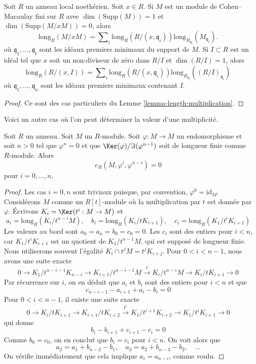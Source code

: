 \begin{lemma}
\label{lemma-additivity-divisors-restricted}
Soit $R$ un anneau local noethérien.
Soit $x \in R$. Si $M$ est un module de Cohen--Macaulay fini sur $R$
avec $\dim(\text{Supp}(M)) = 1$ et $\dim(\text{Supp}(M/xM)) = 0$, alors
$$
\text{long}_R(M/xM)
=
\sum\nolimits_i \text{long}_R(R/(x, \mathfrak q_i))
\text{long}_{R_{\mathfrak q_i}}(M_{\mathfrak q_i}).
$$
où $\mathfrak q_1, \ldots, \mathfrak q_t$ sont les idéaux premiers
minimaux du support de $M$. Si $I \subset R$ est un idéal
tel que $x$ soit un non-diviseur de zéro dans $R/I$ et $\dim(R/I) = 1$, alors
$$
\text{long}_R(R/(x, I))
=
\sum\nolimits_i \text{long}_R(R/(x, \mathfrak q_i))
\text{long}_{R_{\mathfrak q_i}}((R/I)_{\mathfrak q_i})
$$
où $\mathfrak q_1, \ldots, \mathfrak q_n$ sont les idéaux premiers minimaux
contenant $I$.
\end{lemma}

\begin{proof}
Ce sont des cas particuliers du Lemme \ref{lemma-length-multiplication}.
\end{proof}

\noindent
Voici un autre cas où l'on peut déterminer la valeur d'une multiplicité.

\begin{lemma}
\label{lemma-powers-period-length-zero}
Soit $R$ un anneau. Soit $M$ un $R$-module.
Soit $\varphi : M \to M$ un endomorphisme et soit $n > 0$
tel que $\varphi^n = 0$ et que $\Ker(\varphi)/\Im(\varphi^{n - 1})$
soit de longueur finie comme $R$-module.
Alors
$$
e_R(M, \varphi^i, \varphi^{n - i}) = 0
$$
pour $i = 0, \ldots, n$.
\end{lemma}

\begin{proof}
Les cas $i = 0, n$ sont triviaux puisque, par convention, $\varphi^0 = \text{id}_M$.
Considérons $M$ comme un $R[t]$-module où la multiplication par $t$
est donnée par $\varphi$. Écrivons
$K_i = \Ker(t^i : M \to M)$ et
$$
a_i = \text{long}_R(K_i/t^{n - i}M),\quad
b_i = \text{long}_R(K_i/tK_{i + 1}),\quad
c_i = \text{long}_R(K_1/t^iK_{i + 1})
$$
Les valeurs au bord sont $a_0 = a_n = b_0 = c_0 = 0$.
Les $c_i$ sont des entiers pour $i < n$, car $K_1/t^iK_{i + 1}$
est un quotient de $K_1/t^{n - 1}M$, qui est supposé de longueur finie.
Nous utiliserons souvent l'égalité $K_i \cap t^jM = t^jK_{i + j}$.
Pour $0 < i < n - 1$, nous avons une suite exacte
$$
0 \to
K_1/t^{n - i - 1}K_{n - i} \to
K_{i + 1}/t^{n - i - 1}M \xrightarrow{t} K_i/t^{n - i}M
\to K_i/tK_{i + 1} \to 0
$$
Par récurrence sur $i$, on en déduit que $a_i$ et $b_i$ sont
des entiers pour $i < n$ et que
$$
c_{n - i - 1} - a_{i + 1} + a_i - b_i = 0
$$
Pour $0 < i < n - 1$, il existe une suite exacte
$$
0 \to
K_i/tK_{i + 1} \to
K_{i + 1}/tK_{i + 2} \xrightarrow{t^i}
K_1/t^{i + 1}K_{i + 2} \to
K_1/t^iK_{i + 1} \to 0
$$
qui donne
$$
b_i - b_{i + 1} + c_{i + 1} - c_i = 0
$$
Comme $b_0 = c_0$, on en conclut que $b_i = c_i$ pour $i < n$.
On voit alors que
$$
a_2 = a_1 + b_{n - 2} - b_1,\quad
a_3 = a_2 + b_{n - 3} - b_2,\quad \ldots
$$
On vérifie immédiatement que cela implique $a_i = a_{n - i}$, comme voulu.
\end{proof}


